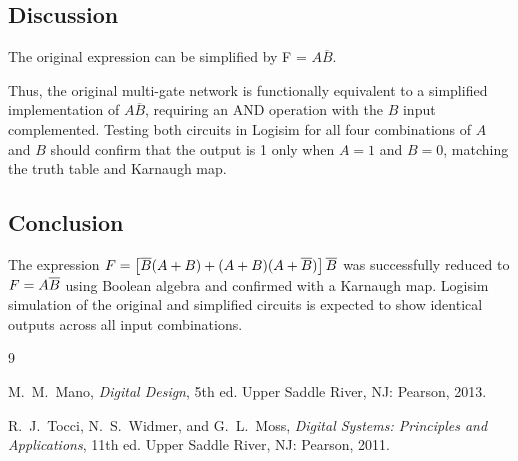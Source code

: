 \documentclass[12pt,a4paper]{article}
\begin{document}
\subsection*{Discussion}
The original expression can be simplified by F = \(A\overline{B}\).

Thus, the original multi-gate network is functionally equivalent to a simplified implementation of \(A\overline{B}\), requiring an AND operation with the \(B\) input complemented. Testing both circuits in Logisim for all four combinations of \(A\) and \(B\) should confirm that the output is 1 only when \(A=1\) and \(B=0\), matching the truth table and Karnaugh map.

\subsection*{Conclusion}
The expression $F = \left[\overline{B}(A+B) + (A+B)(A+\overline{B})\right]\overline{B}$ was successfully reduced to $F = A\overline{B}$ using Boolean algebra and confirmed with a Karnaugh map. Logisim simulation of the original and simplified circuits is expected to show identical outputs across all input combinations.



\begin{thebibliography}{9}

M.\ M.\ Mano, \emph{Digital Design}, 5th ed. Upper Saddle River, NJ: Pearson, 2013.

R.\ J.\ Tocci, N.\ S.\ Widmer, and G.\ L.\ Moss, \emph{Digital Systems: Principles and Applications}, 11th ed. Upper Saddle River, NJ: Pearson, 2011.

\end{thebibliography}
\end{document}

